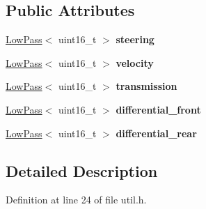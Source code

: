 \subsection*{Public Attributes}
\begin{DoxyCompactItemize}
\item 
\hyperlink{classSPMB_1_1LowPass}{Low\+Pass}$<$ uint16\+\_\+t $>$ {\bfseries steering}\hypertarget{structSPMB_1_1util_1_1control__filtered_acfb55895cf3f448daba4805d3c721dae}{}\label{structSPMB_1_1util_1_1control__filtered_acfb55895cf3f448daba4805d3c721dae}

\item 
\hyperlink{classSPMB_1_1LowPass}{Low\+Pass}$<$ uint16\+\_\+t $>$ {\bfseries velocity}\hypertarget{structSPMB_1_1util_1_1control__filtered_a5aef24fc07fad743734bb36fffe0ee16}{}\label{structSPMB_1_1util_1_1control__filtered_a5aef24fc07fad743734bb36fffe0ee16}

\item 
\hyperlink{classSPMB_1_1LowPass}{Low\+Pass}$<$ uint16\+\_\+t $>$ {\bfseries transmission}\hypertarget{structSPMB_1_1util_1_1control__filtered_ad64df625235662b019cc11f7b5e8c555}{}\label{structSPMB_1_1util_1_1control__filtered_ad64df625235662b019cc11f7b5e8c555}

\item 
\hyperlink{classSPMB_1_1LowPass}{Low\+Pass}$<$ uint16\+\_\+t $>$ {\bfseries differential\+\_\+front}\hypertarget{structSPMB_1_1util_1_1control__filtered_ac5678602b91470ee02f848c155036f5f}{}\label{structSPMB_1_1util_1_1control__filtered_ac5678602b91470ee02f848c155036f5f}

\item 
\hyperlink{classSPMB_1_1LowPass}{Low\+Pass}$<$ uint16\+\_\+t $>$ {\bfseries differential\+\_\+rear}\hypertarget{structSPMB_1_1util_1_1control__filtered_a619aa50937200c894bb3dc0478ab58bd}{}\label{structSPMB_1_1util_1_1control__filtered_a619aa50937200c894bb3dc0478ab58bd}

\end{DoxyCompactItemize}


\subsection{Detailed Description}


Definition at line 24 of file util.\+h.

